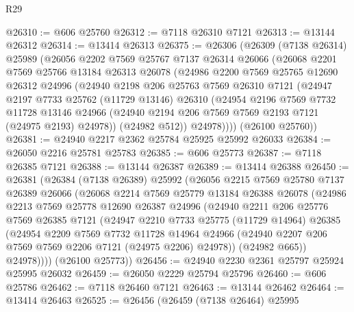 \begin{lexlean}{R29}
\begin{coremodule}
@26310 := @606 @25760
@26312 := @7118 @26310 @7121
@26313 := @13144 @26312
@26314 := @13414 @26313
@26375 := @26306
    (@26309
      (@7138 @26314)
      @25989
      (@26056
        @2202
        @7569
        @25767
        @7137
        @26314
        @26066
        (@26068
          @2201
          @7569
          @25766
          @13184
          @26313
          @26078
          (@24986
            @2200
            @7569
            @25765
            @12690
            @26312
            @24996
            (@24940
              @2198
              @206
              @25763
              @7569
              @26310
              @7121
              (@24947
                @2197
                @7733
                @25762
                (@11729 @13146)
                @26310
                (@24954
                  @2196
                  @7569
                  @7732
                  @11728
                  @13146
                  @24966
                  (@24940 @2194 @206 @7569 @7569 @2193 @7121 (@24975 @2193) @24978))
                (@24982 @512))
              @24978))))
      (@26100 @25760))
@26381 := @24940 @2217 @2362 @25784 @25925 @25992 @26033
@26384 := @26050 @2216 @25781 @25783
@26385 := @606 @25773
@26387 := @7118 @26385 @7121
@26388 := @13144 @26387
@26389 := @13414 @26388
@26450 := @26381
    (@26384
      (@7138 @26389)
      @25992
      (@26056
        @2215
        @7569
        @25780
        @7137
        @26389
        @26066
        (@26068
          @2214
          @7569
          @25779
          @13184
          @26388
          @26078
          (@24986
            @2213
            @7569
            @25778
            @12690
            @26387
            @24996
            (@24940
              @2211
              @206
              @25776
              @7569
              @26385
              @7121
              (@24947
                @2210
                @7733
                @25775
                (@11729 @14964)
                @26385
                (@24954
                  @2209
                  @7569
                  @7732
                  @11728
                  @14964
                  @24966
                  (@24940 @2207 @206 @7569 @7569 @2206 @7121 (@24975 @2206) @24978))
                (@24982 @665))
              @24978))))
      (@26100 @25773))
@26456 := @24940 @2230 @2361 @25797 @25924 @25995 @26032
@26459 := @26050 @2229 @25794 @25796
@26460 := @606 @25786
@26462 := @7118 @26460 @7121
@26463 := @13144 @26462
@26464 := @13414 @26463
@26525 := @26456
    (@26459
      (@7138 @26464)
      @25995

\end{coremodule}
\end{lexlean}
